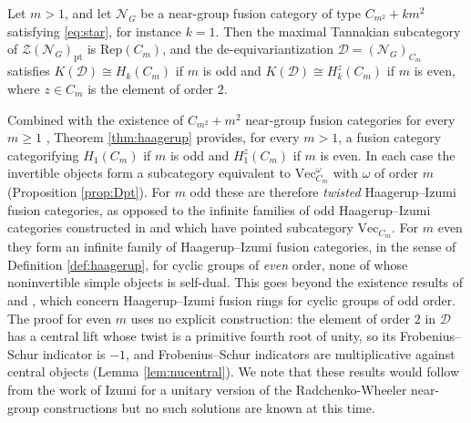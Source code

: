 \documentclass[10pt]{article}
\theoremstyle{plain}
\theoremstyle{definition}
\theoremstyle{plain}
\newenvironment{customthm}[1]{\renewcommand\theinnercustomthm{#1}\innercustomthm}{\endinnercustomthm}
\begin{document}
\begin{customthm}{\ref{thm:haagerup}}
Let $m>1$, and let $\mathcal{N}_G$ be a near-group fusion category of type $C_{m^2}+km^2$ satisfying \eqref{eq:star}, for instance $k=1$. Then the maximal Tannakian subcategory of $\mathcal{Z}(\mathcal{N}_G)_\mathrm{pt}$ is $\mathrm{Rep}(C_m)$, and the de-equivariantization $\mathcal{D}=(\mathcal{N}_G)_{C_m}$ satisfies $K(\mathcal{D})\cong H_k(C_m)$ if $m$ is odd and $K(\mathcal{D})\cong H_k^z(C_m)$ if $m$ is even, where $z\in C_m$ is the element of order $2$.
\end{customthm}

\par Combined with the existence of $C_{m^2}+m^2$ near-group fusion categories for every $m\geq1$ \cite{radchenko2026realquadraticfieldsfinite}, Theorem \ref{thm:haagerup} provides, for every $m>1$, a fusion category categorifying $H_1(C_m)$ if $m$ is odd and $H_1^z(C_m)$ if $m$ is even. In each case the invertible objects form a subcategory equivalent to $\mathrm{Vec}_{C_m}^\omega$ with $\omega$ of order $m$ (Proposition \ref{prop:Dpt}). For $m$ odd these are therefore \emph{twisted} Haagerup--Izumi fusion categories, as opposed to the infinite families of odd Haagerup--Izumi categories constructed in \cite{gannon2026haagerupizumifusioncategories}
 and \cite{huang2026cyclichaagerupizumifusioncategories} which have pointed subcategory $\mathrm{Vec}_{C_m}$. For $m$ even they form an infinite family of Haagerup--Izumi fusion categories, in the sense of Definition \ref{def:haagerup}, for cyclic groups of \emph{even} order, none of whose noninvertible simple objects is self-dual. This goes beyond the existence results of \cite{gannon2026haagerupizumifusioncategories} and \cite{huang2026cyclichaagerupizumifusioncategories}, which concern Haagerup--Izumi fusion rings for cyclic groups of odd order. The proof for even $m$ uses no explicit construction: the element of order $2$ in $\mathcal{D}$ has a central lift whose twist is a primitive fourth root of unity, so its Frobenius--Schur indicator is $-1$, and Frobenius--Schur indicators are multiplicative against central objects (Lemma \ref{lem:nucentral}). We note that these results would follow from the work of Izumi \cite[Section 12]{MR3635673} for a unitary version of the Radchenko-Wheeler near-group constructions \cite[Section 5]{radchenko2026realquadraticfieldsfinite} but no such solutions are known at this time.
\end{document}
